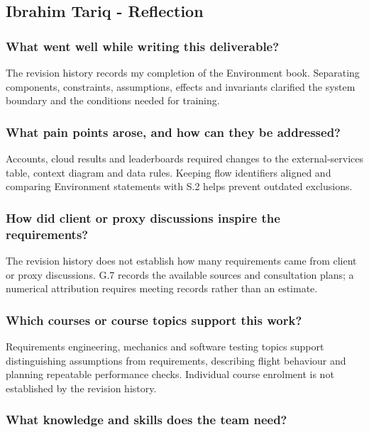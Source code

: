 \documentclass[12pt]{article}
\begin{document}
\subsection*{Ibrahim Tariq - Reflection}

\subsubsection*{What went well while writing this deliverable?}

The revision history records my completion of the Environment book. Separating components, constraints, assumptions, effects and invariants clarified the system boundary and the conditions needed for training.

\subsubsection*{What pain points arose, and how can they be addressed?}

Accounts, cloud results and leaderboards required changes to the external-services table, context diagram and data rules. Keeping flow identifiers aligned and comparing Environment statements with S.2 helps prevent outdated exclusions.

\subsubsection*{How did client or proxy discussions inspire the requirements?}

The revision history does not establish how many requirements came from client or proxy discussions. G.7 records the available sources and consultation plans; a numerical attribution requires meeting records rather than an estimate.

\subsubsection*{Which courses or course topics support this work?}

Requirements engineering, mechanics and software testing topics support distinguishing assumptions from requirements, describing flight behaviour and planning repeatable performance checks. Individual course enrolment is not established by the revision history.

\subsubsection*{What knowledge and skills does the team need?}
\end{document}
